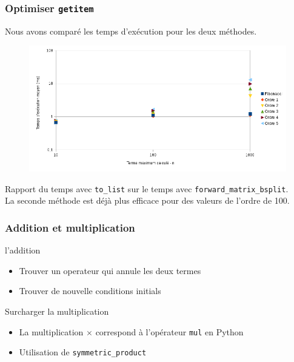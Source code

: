 \documentclass{beamer}
\newlength{\charwidth}
\newcommand{\uline}{\underline{\hspace{2\charwidth}}}
\begin{document}

\begin{frame}
\frametitle{Optimiser \texttt{\uline getitem \uline}}
\begin{center}
Nous avons comparé les temps d'exécution pour les deux méthodes.
\begin{figure}
    \includegraphics[scale=0.4]{graphe}
\end{figure}
{\scriptsize Rapport du temps avec \texttt{to\_list} sur le temps avec 
\texttt{forward\_matrix\_bsplit}.}\\
\vspace{1cm}
La seconde méthode est déjà plus efficace pour des valeurs de l'ordre de 100.
\end{center}
\end{frame}


\begin{frame}
\frametitle{Addition et multiplication}
\begin{center}
\begin{block}{l'addition}
    \begin{itemize}
        \item Trouver un operateur qui annule les deux termes
        \item Trouver de nouvelle conditions initials
    \end{itemize}
\end{block}
\vspace{1cm}
\begin{block}{Surcharger la multiplication}
    \begin{itemize}
        \item La multiplication $\times$ correspond à l'opérateur \texttt{\uline mul\uline} en
            Python
        \item Utilisation de \texttt{symmetric\_product}
    \end{itemize}
\end{block}
\end{center}
\end{frame}
\end{document}
